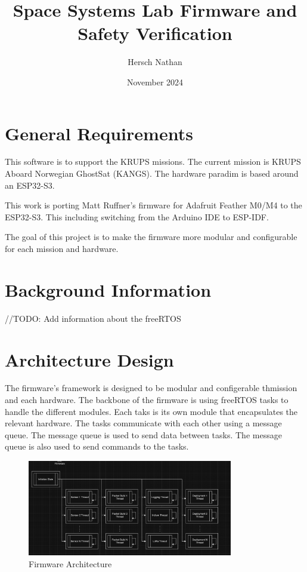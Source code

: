 \documentclass{article}
\title{Space Systems Lab Firmware and Safety Verification}
\author{Hersch Nathan}
\date{November 2024}
\begin{document}
\maketitle

\section{General Requirements}
\par This software is to support the KRUPS missions. The current mission is KRUPS Aboard Norwegian GhostSat (KANGS). The hardware paradim is based around an ESP32-S3. 
\par This work is porting Matt Ruffner's firmware for Adafruit Feather M0/M4 to the ESP32-S3. This including switching from the Arduino IDE to ESP-IDF.
\par The goal of this project is to make the firmware more modular and configurable for each mission and hardware.

\section{Background Information}

//TODO: Add information about the freeRTOS

\section{Architecture Design}
\par The firmware's framework is designed to be modular and configerable thmission and each hardware. The backbone of the firmware is using freeRTOS tasks to handle the different modules. Each taks is its own module that encapsulates the relevant hardware. The tasks communicate with each other using a message queue. The message queue is used to send data between tasks. The message queue is also used to send commands to the tasks.

\begin{figure} [H]
    \centering
    \includegraphics[width=0.8\textwidth]{images/firmware-architecture.png}
    \caption{Firmware Architecture}
    \label{fig:firmware-architecture} 
\end{figure}
\end{document}
